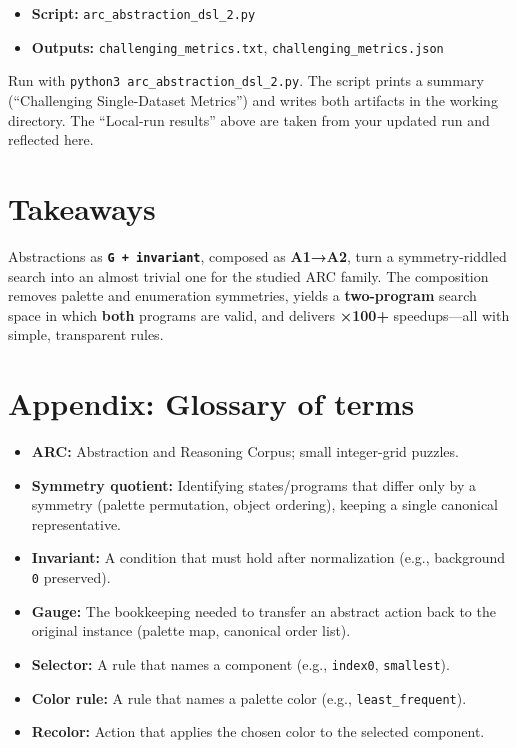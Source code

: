 \documentclass[11pt]{article}
\newcommand{\code}[1]{\texttt{#1}}
\begin{document}
\begin{itemize}
\item \textbf{Script:} \code{arc\_abstraction\_dsl\_2.py}
\item \textbf{Outputs:} \code{challenging\_metrics.txt}, \code{challenging\_metrics.json}
\end{itemize}

Run with \code{python3 arc\_abstraction\_dsl\_2.py}. The script prints a summary (``Challenging Single-Dataset Metrics'') and writes both artifacts in the working directory. The ``Local-run results'' above are taken from your updated run and reflected here.

\section{Takeaways}

Abstractions as \textbf{\code{G + invariant}}, composed as \textbf{A1→A2}, turn a symmetry-riddled search into an almost trivial one for the studied ARC family. The composition removes palette and enumeration symmetries, yields a \textbf{two-program} search space in which \textbf{both} programs are valid, and delivers \textbf{×100+} speedups---all with simple, transparent rules.

\section*{Appendix: Glossary of terms}

\begin{itemize}
\item \textbf{ARC:} Abstraction and Reasoning Corpus; small integer-grid puzzles.
\item \textbf{Symmetry quotient:} Identifying states/programs that differ only by a symmetry (palette permutation, object ordering), keeping a single canonical representative.
\item \textbf{Invariant:} A condition that must hold after normalization (e.g., background \code{0} preserved).
\item \textbf{Gauge:} The bookkeeping needed to transfer an abstract action back to the original instance (palette map, canonical order list).
\item \textbf{Selector:} A rule that names a component (e.g., \code{index0}, \code{smallest}).
\item \textbf{Color rule:} A rule that names a palette color (e.g., \code{least\_frequent}).
\item \textbf{Recolor:} Action that applies the chosen color to the selected component.
\end{itemize}
\end{document}
